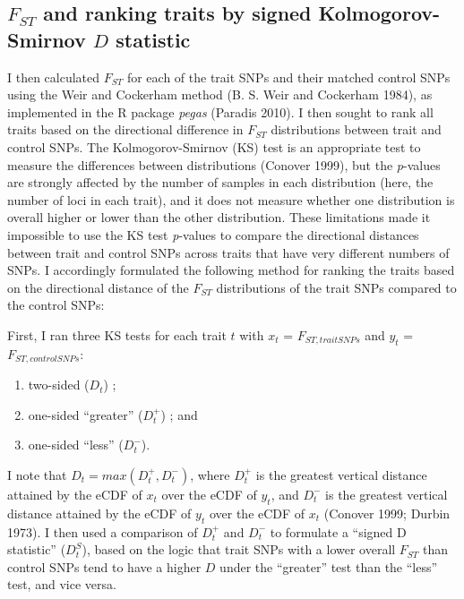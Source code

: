 \documentclass[
]{book}
\begin{document}
\hypertarget{f_st-and-ranking-traits-by-signed-kolmogorov-smirnov-d-statistic}{%
\subsection{\texorpdfstring{\(F_{ST}\) and ranking traits by signed Kolmogorov-Smirnov \(D\) statistic}{F\_\{ST\} and ranking traits by signed Kolmogorov-Smirnov D statistic}}\label{f_st-and-ranking-traits-by-signed-kolmogorov-smirnov-d-statistic}}

I then calculated \(F_{ST}\) for each of the trait SNPs and their matched control SNPs using the Weir and Cockerham method (B. S. Weir and Cockerham 1984), as implemented in the R package \emph{pegas} (Paradis 2010). I then sought to rank all traits based on the directional difference in \(F_{ST}\) distributions between trait and control SNPs. The Kolmogorov-Smirnov (KS) test is an appropriate test to measure the differences between distributions (Conover 1999), but the \emph{p}-values are strongly affected by the number of samples in each distribution (here, the number of loci in each trait), and it does not measure whether one distribution is overall higher or lower than the other distribution. These limitations made it impossible to use the KS test \emph{p}-values to compare the directional distances between trait and control SNPs across traits that have very different numbers of SNPs. I accordingly formulated the following method for ranking the traits based on the directional distance of the \(F_{ST}\) distributions of the trait SNPs compared to the control SNPs:

First, I ran three KS tests for each trait \(t\) with \(x_t\) = \(F_{ST, trait SNPs}\) and \(y_t\) = \(F_{ST, control SNPs}\):

\begin{enumerate}
\def\labelenumi{\arabic{enumi}.}
\item
  two-sided (\(D_t\)) ;
\item
  one-sided ``greater'' (\(D_t^+\)) ; and
\item
  one-sided ``less'' (\(D_t^-\)).
\end{enumerate}

I note that \(D_{t} = max(D_t^+, D_t^-)\), where \(D_t^+\) is the greatest vertical distance attained by the eCDF of \(x_t\) over the eCDF of \(y_t\), and \(D_t^-\) is the greatest vertical distance attained by the eCDF of \(y_t\) over the eCDF of \(x_t\) (Conover 1999; Durbin 1973). I then used a comparison of \(D_t^+\) and \(D_t^-\) to formulate a ``signed D statistic'' (\(D_t^S\)), based on the logic that trait SNPs with a lower overall \(F_{ST}\) than control SNPs tend to have a higher \(D\) under the ``greater'' test than the ``less'' test, and vice versa.
\end{document}
